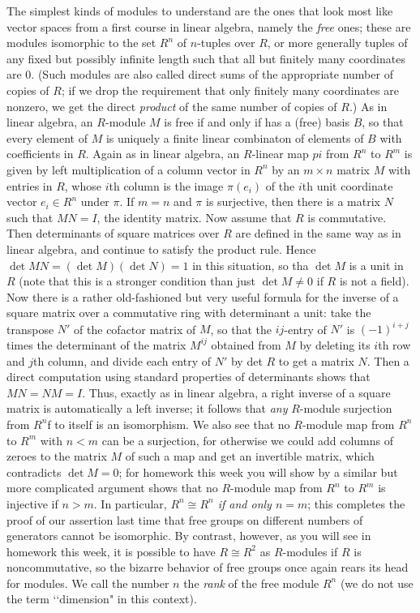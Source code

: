 \documentclass[10pt]{article}
\begin{document}
The simplest kinds of modules to understand are the ones that look most
like vector spaces from a first course in linear algebra, namely the
{\sl free} ones; these are modules isomorphic to the set $R^n$ of
$n$-tuples over $R$, or more generally tuples of any fixed but possibly
infinite length such that all but finitely many coordinates are 0. (Such
modules are also called direct sums of the appropriate number of copies
of $R$; if we drop the requirement that only finitely many coordinates
are nonzero, we get the direct {\sl product} of the same number of
copies of $R$.) As in linear algebra, an $R$-module $M$ is free if and
only if has a (free) basis $B$, so that every element of $M$ is uniquely
a finite linear combinaton of elements of $B$ with coefficients in $R$.
Again as in linear algebra, an $R$-linear map $pi$ from $R^n$ to $R^m$
is given by left multiplication of a column vector in $R^n$ by an
$m\times n$ matrix $M$ with entries in $R$, whose $i$th column is the
image $\pi(e_i)$ of the $i$th unit coordinate vector $e_i\in R^n$ under
$\pi$. If $m=n$ and $\pi$ is surjective, then there is a matrix $N$ such
that $MN = I$, the identity matrix. Now assume that $R$ is commutative.
Then determinants of square matrices over $R$ are defined in the same
way as in linear algebra, and continue to satisfy the product rule.
Hence $\det MN =(\det M)(\det N) = 1$ in this situation, so tha $\det M$
is a unit in $R$ (note that this is a stronger condition than just $\det
M\ne0$ if $R$ is not a field). Now there is a rather old-fashioned but
very useful formula for the inverse of a square matrix over a
commutative ring with determinant a unit: take the transpose $N'$ of the
cofactor matrix of $M$, so that the $ij$-entry of $N'$ is $(-1)^{i+j}$
times the determinant of the matrix $M^{ij}$ obtained from $M$ by
deleting its $i$th row and $j$th column, and divide each entry of $N'$
by det $R$ to get a matrix $N$. Then a direct computation using standard
properties of determinants shows that $MN = NM = I$. Thus, exactly as in
linear algebra, a right inverse of a square matrix is automatically a
left inverse; it follows that {\sl any} $R$-module surjection from
$R^n$f to itself is an isomorphism. We also see that no $R$-module map
from $R^n$ to $R^m$ with $n<m$ can be a surjection, for otherwise we
could add columns of zeroes to the matrix $M$ of such a map and get an
invertible matrix, which contradicts $\det M=0$; for homework this week
you will show by a similar but more complicated argument shows that no
$R$-module map from $R^n$ to $R^m$ is injective if $n>m$. In particular,
{\sl $R^n \cong R^n$ if and only $n=m$}; this completes the proof of our
assertion last time that free groups on different numbers of generators
cannot be isomorphic. By contrast, however, as you will see in homework
this week, it is possible to have $R\cong R^2$ as $R$-modules if $R$ is
noncommutative, so the bizarre behavior of free groups once again rears
its head for modules. We call the number $n$ the {\sl rank} of the free
module $R^n$ (we do not use the term \lq\lq dimension" in this context).
\end{document}
